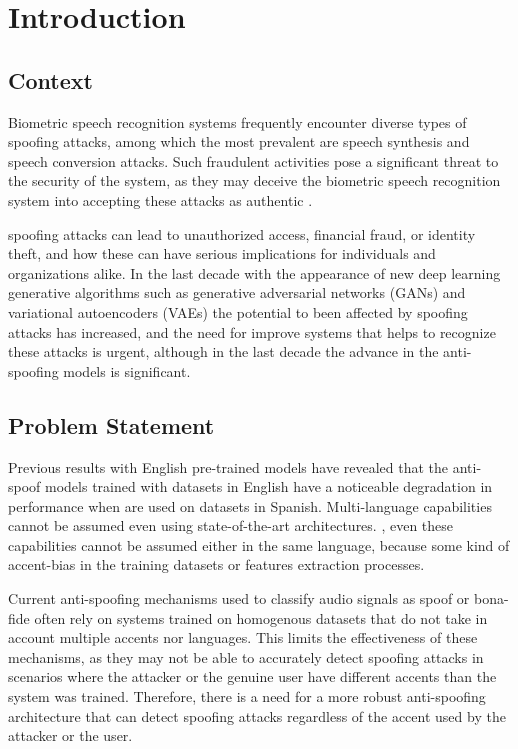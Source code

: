 

\chapter{Introduction}

\section{Context}

Biometric speech recognition systems frequently encounter diverse types of spoofing attacks, among which the most prevalent are speech synthesis and speech conversion attacks. Such fraudulent activities pose a significant threat to the security of the system, as they may deceive the biometric speech recognition system into accepting these attacks as authentic \cite{xue2023physiological}.

spoofing attacks can lead to unauthorized access, financial fraud, or identity theft, and how these can have serious implications for individuals and organizations alike. In the last decade with the appearance of new deep learning generative algorithms such as generative adversarial networks (GANs) \cite{goodfellow2020generative} and variational autoencoders (VAEs) \cite{kingma2013auto} the potential to been affected by spoofing attacks has increased, and the need for improve systems that helps to recognize these attacks is urgent, although in the last decade the advance in the anti-spoofing models is significant.

\section{Problem Statement}

Previous results with English pre-trained models have revealed that the anti-spoof models trained with datasets in English have a noticeable degradation in performance when are used on datasets in Spanish. Multi-language capabilities cannot be assumed even using state-of-the-art architectures. \cite{tamayo2022voice}, even these capabilities cannot be assumed either in the same language, because some kind of accent-bias in the training datasets or features extraction processes.

Current anti-spoofing mechanisms used to classify audio signals as spoof or bona-fide often rely on systems trained on homogenous datasets that do not take in account multiple accents nor languages. This limits the effectiveness of these mechanisms, as they may not be able to accurately detect spoofing attacks in scenarios where the attacker or the genuine user have different accents than the system was trained. Therefore, there is a need for a more robust anti-spoofing architecture that can detect spoofing attacks regardless of the accent used by the attacker or the user.

